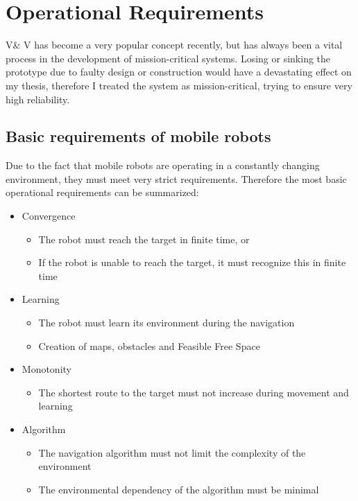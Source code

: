 \section{Operational Requirements}

V\& V has become a very popular concept recently, but has always been a vital process in the development of mission-critical systems. Losing or sinking the prototype due to faulty design or construction would have a devastating effect on my thesis, therefore I treated the system as mission-critical, trying to ensure very high reliability.

\subsection{Basic requirements of mobile robots}

Due to the fact that mobile robots are operating in a constantly changing environment, they must meet very strict requirements. Therefore the most basic operational requirements can be summarized: \cite{navreq}
\begin{itemize}

\item Convergence
\begin{itemize}
	\item The robot must reach the target in finite time, or
	\item If the robot is unable to reach the target, it must recognize this in finite time
\end{itemize}

\item Learning
\begin{itemize}
	\item The robot must learn its environment during the navigation
	\item Creation of maps, obstacles and Feasible Free Space
\end{itemize}

\item Monotonity
\begin{itemize}
	\item The shortest route to the target must not increase during movement and learning
\end{itemize}

\item Algorithm
\begin{itemize}
	\item The navigation algorithm must not limit the complexity of the environment
	\item The environmental dependency of the algorithm must be minimal
\end{itemize}

\end{itemize}

